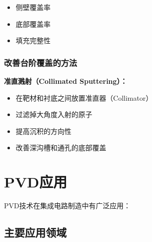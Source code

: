 \documentclass[UTF8,12pt,a4paper]{ctexart}
\begin{document}
\begin{itemize}
    \item 侧壁覆盖率
    \item 底部覆盖率
    \item 填充完整性
\end{itemize}

\subsubsection{改善台阶覆盖的方法}

\textbf{准直溅射（Collimated Sputtering）：}
\begin{itemize}
    \item 在靶材和衬底之间放置准直器（Collimator）
    \item 过滤掉大角度入射的原子
    \item 提高沉积的方向性
    \item 改善深沟槽和通孔的底部覆盖
\end{itemize}

\section{PVD应用}

PVD技术在集成电路制造中有广泛应用：

\subsection{主要应用领域}
\end{document}
